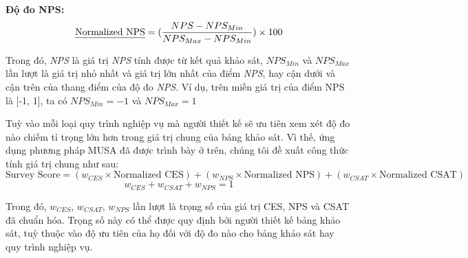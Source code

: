 \textbf{Độ đo NPS:}
\[ \text{\emph{Normalized NPS}} = (\frac{NPS - NPS_{Min}}{NPS_{Max} - NPS_{Min}}) \times 100\]
\par
Trong đó, \emph{NPS} là giá trị \emph{NPS} tính được từ kết quả khảo sát, $NPS_{Min}$ và $NPS_{Max}$ lần lượt là giá trị nhỏ nhất và giá trị lớn nhất của điểm \emph{NPS}, hay cận dưới và cận trên của thang điểm của độ đo \emph{NPS}. Ví dụ, trên miền giá trị của điểm NPS là [-1, 1], ta có $NPS_{Min} = -1$ và $NPS_{Max} = 1$
\par
Tuỳ vào mỗi loại quy trình nghiệp vụ mà người thiết kế sẽ ưu tiên xem xét độ đo nào chiếm tỉ trọng lớn hơn trong giá trị chung của bảng khảo sát. Vì thế, ứng dụng phương pháp MUSA đã được trình bày ở trên, chúng tôi đề xuất công thức tính giá trị chung như sau:
\[ \text{Survey Score} = (w_{CES} \times \text{Normalized CES}) + (w_{NPS} \times \text{Normalized NPS}) + (w_{CSAT} \times \text{Normalized CSAT})\]
\[ w_{CES} + w_{CSAT} + w_{NPS} = 1\]
\par
Trong đó, $w_{CES}$, $w_{CSAT}$, $w_{NPS}$ lần lượt là trọng số của giá trị CES, NPS và CSAT đã chuẩn hóa. Trọng số này có thể được quy định bởi người thiết kế bảng khảo sát, tuỳ thuộc vào độ ưu tiên của họ đối với độ đo nào cho bảng khảo sát hay quy trình nghiệp vụ.

